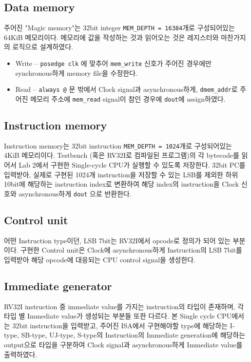 \documentclass{scrartcl}
\begin{document}
\subsection{Data memory}
주어진 "Magic memory"는 32bit integer \texttt{MEM\_DEPTH = 16384}개로 구성되어있는 64KiB 메모리이다.
메모리에 값을 작성하는 것과 읽어오는 것은 레지스터와 마찬가지의 로직으로 설계하였다.

\begin{itemize}
    \item Write -- \texttt{posedge clk} 에 맞추어 \texttt{mem\_write} 신호가 주어진
    경우에만 synchronous하게 memory file을 수정한다.
    \item Read -- \texttt{always @} 문 밖에서 Clock signal과 asynchronous하게, \texttt{dmem\_addr}로
    주어진 메모리 주소에 \texttt{mem\_read} signal이 참인 경우에 \texttt{dout}에 assign하였다.
\end{itemize}

\subsection{Instruction memory}
Instruction memory는 32bit instruction \texttt{MEM\_DEPTH = 1024}개로 구성되어있는 4KiB 메모리이다.
Testbench (혹은 RV32I로 컴파일된 프로그램)의 각 bytecode를 읽어서 Lab 2에서 구현한 Single-cycle CPU가
실행할 수 있도록 저장한다. 32bit PC를 입력받아, 실제로 구현된 1024개 instruction을 저장할 수 있는 LSB를 제외한
하위 10bit에 해당하는 instruction index로 변환하여 해당 index의 instruction을 Clock 신호와
asynchronous하게 \texttt{dout} 으로 반환한다.

\subsection{Control unit}
어떤 Instruction type이던, LSB 7bit는 RV32I에서 opcode로 정의가 되어 있는 부분이다.
구현한 Control unit은 Clock에 asynchronous하게 Instruction의 LSB 7bit를 입력받아 해당 opcode에 대응되는
CPU control signal을 생성한다.

\subsection{Immediate generator}
RV32I instruction 중 immediate value를 가지는 instruction의 타입이 존재하며, 각 타입 별 Immediate value가
생성되는 부분들 또한 다르다. 본 Single cycle CPU에서는 32bit instruction을 입력받고, 주어진 ISA에서
구현해야할 type에 해당하는 I-type, SB-type, UJ-type, S-type의 Instruction의 Immediate generation에 해당하는
output으로 타입을 구분하여 Clock signal과 asynchronous하게 Immediate value를 출력하였다.
\end{document}
